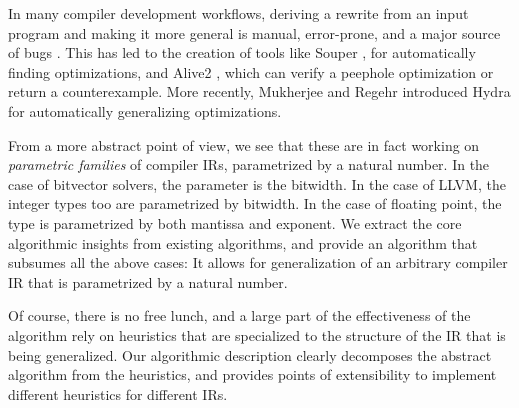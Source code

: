 \documentclass[review, anonymous, acmsmall]{acmart}
\begin{document}
In many compiler development workflows, deriving a rewrite from an input program and making it more general is manual,
error-prone, and a major source of bugs \cite{yang_finding_2011}.
This has led to the creation of tools like Souper \cite{sasnauskas_souper_2018},
for automatically finding optimizations,
and Alive2 \cite{lopes_provably_2015, lopes_alive2_2021},
which can verify a peephole optimization or return a counterexample.
More recently, Mukherjee and Regehr \cite{mukherjee_hydra_2024} introduced Hydra for automatically generalizing optimizations.

From a more abstract point of view, we see that these are in fact working on \emph{parametric families} of compiler IRs,
parametrized by a natural number.
In the case of bitvector solvers, the parameter is the bitwidth.
In the case of LLVM, the integer types too are parametrized by bitwidth.
In the case of floating point, the type is parametrized by both mantissa and exponent.
We extract the core algorithmic insights from existing algorithms,
and provide an algorithm that subsumes all the above cases: It allows for generalization of an arbitrary compiler IR
that is parametrized by a natural number.

Of course, there is no free lunch, and a large part of the effectiveness of the algorithm
rely on heuristics that are specialized to the structure of the IR that is being generalized.
Our algorithmic description clearly decomposes the abstract algorithm from the heuristics,
and provides points of extensibility to implement different heuristics for different IRs.


\end{document}
